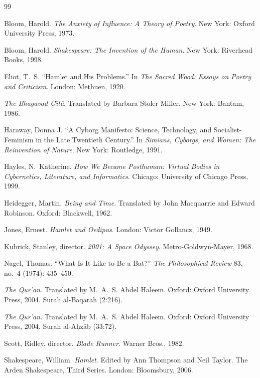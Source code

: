 \documentclass[11pt]{article}
\begin{document}
\begin{thebibliography}{99}

Bloom, Harold. \textit{The Anxiety of Influence: A Theory of Poetry}. New York: Oxford University Press, 1973.

Bloom, Harold. \textit{Shakespeare: The Invention of the Human}. New York: Riverhead Books, 1998.

Eliot, T.~S. ``Hamlet and His Problems.'' In \textit{The Sacred Wood: Essays on Poetry and Criticism}. London: Methuen, 1920.

\textit{The Bhagavad G\=\i t\=a}. Translated by Barbara Stoler Miller. New York: Bantam, 1986.

Haraway, Donna J. ``A Cyborg Manifesto: Science, Technology, and Socialist-Feminism in the Late Twentieth Century.'' In \textit{Simians, Cyborgs, and Women: The Reinvention of Nature}. New York: Routledge, 1991.

Hayles, N.~Katherine. \textit{How We Became Posthuman: Virtual Bodies in Cybernetics, Literature, and Informatics}. Chicago: University of Chicago Press, 1999.

Heidegger, Martin. \textit{Being and Time}. Translated by John Macquarrie and Edward Robinson. Oxford: Blackwell, 1962.

Jones, Ernest. \textit{Hamlet and Oedipus}. London: Victor Gollancz, 1949.

Kubrick, Stanley, director. \textit{2001: A Space Odyssey}. Metro-Goldwyn-Mayer, 1968.

Nagel, Thomas. ``What Is It Like to Be a Bat?'' \textit{The Philosophical Review} 83, no.~4 (1974): 435--450.

\textit{The Qur'an}. Translated by M.~A.~S. Abdel Haleem. Oxford: Oxford University Press, 2004. Surah al-Baqarah (2:216).

\textit{The Qur'an}. Translated by M.~A.~S. Abdel Haleem. Oxford: Oxford University Press, 2004. Surah al-A\d{h}z\=ab (33:72).

Scott, Ridley, director. \textit{Blade Runner}. Warner Bros., 1982.

Shakespeare, William. \textit{Hamlet}. Edited by Ann Thompson and Neil Taylor. The Arden Shakespeare, Third Series. London: Bloomsbury, 2006.

\end{thebibliography}
\end{document}
